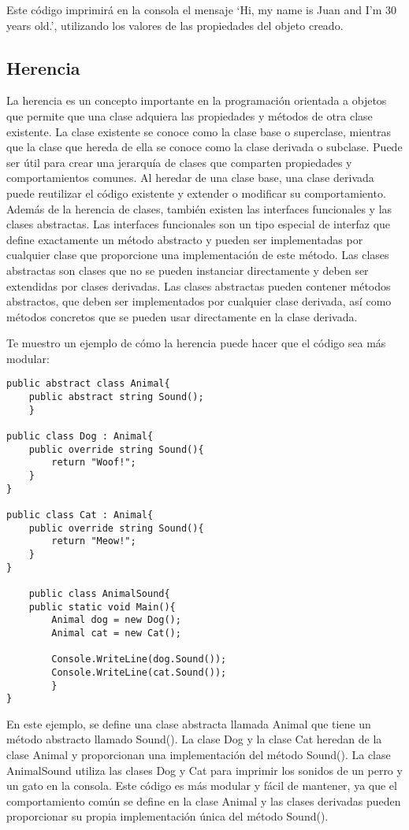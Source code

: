 \documentclass[executivepaper]{article}
\begin{document}
Este código imprimirá en la consola el mensaje \enquote*{Hi, my name is  Juan and I'm 30 years old.}, utilizando los valores de las propiedades del objeto creado.

\subsection{Herencia}

La herencia es un concepto importante en la programación orientada a objetos que permite que una clase adquiera las propiedades y métodos de otra clase existente. La clase existente se conoce como la clase base o superclase, mientras que la clase que hereda de ella se conoce como la clase derivada o subclase. Puede ser útil para crear una jerarquía de clases que comparten propiedades y comportamientos comunes. Al heredar de una clase base, una clase derivada puede reutilizar el código existente y extender o modificar su comportamiento. Además de la herencia de clases, también existen las interfaces funcionales y las clases abstractas. Las interfaces funcionales son un tipo especial de interfaz que define exactamente un método abstracto y pueden ser implementadas por cualquier clase que proporcione una implementación de este método. Las clases abstractas son clases que no se pueden instanciar directamente y deben ser extendidas por clases derivadas. Las clases abstractas pueden contener métodos abstractos, que deben ser implementados por cualquier clase derivada, así como métodos concretos que se pueden usar directamente en la clase derivada.

Te muestro un ejemplo de cómo la herencia puede hacer que el código sea más modular:

\begin{lstlisting}
public abstract class Animal{
    public abstract string Sound();
    }

public class Dog : Animal{
    public override string Sound(){
        return "Woof!";
    }
}

public class Cat : Animal{
    public override string Sound(){
        return "Meow!";
    }
}

    public class AnimalSound{
    public static void Main(){
        Animal dog = new Dog();
        Animal cat = new Cat();

        Console.WriteLine(dog.Sound());
        Console.WriteLine(cat.Sound());
        }
}
\end{lstlisting}

En este ejemplo, se define una clase abstracta llamada Animal que tiene un método abstracto llamado Sound(). La clase Dog y la clase Cat heredan de la clase Animal y proporcionan una implementación del método Sound(). La clase AnimalSound utiliza las clases Dog y Cat para imprimir los sonidos de un perro y un gato en la consola. Este código es más modular y fácil de mantener, ya que el comportamiento común se define en la clase Animal y las clases derivadas pueden proporcionar su propia implementación única del método Sound().
\end{document}
